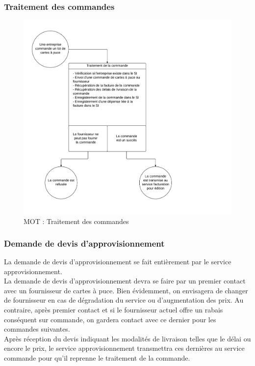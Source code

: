 \subsubsection{Traitement des commandes}
\begin{figure}[ht!]
    \centering
    \includegraphics[width=\textwidth]{mot-traitement-commandes}
    \caption{MOT : Traitement des commandes}
    \label{fig:mot-traitement-commandes}
\end{figure}
\newpage

\subsubsection{Demande de devis d'approvisionnement}

La demande de devis d'approvisionnement se fait entièrement par le service
approvisionnement. \\

La demande de devis d'approvisionnement devra se faire par un premier
contact avec un fournisseur de cartes à puce. Bien évidemment, on
envisagera de changer de fournisseur en cas de dégradation du service ou
d'augmentation des prix. Au contraire, après premier contact et si le
fournisseur actuel offre un rabais conséquent sur commande, on gardera contact
avec ce dernier pour les commandes suivantes. \\

Après réception du devis indiquant les modalités de livraison telles que le
délai ou encore le prix, le service approvisionnement transmettra ces dernières
au service commande pour qu'il reprenne le traitement de la commande.

